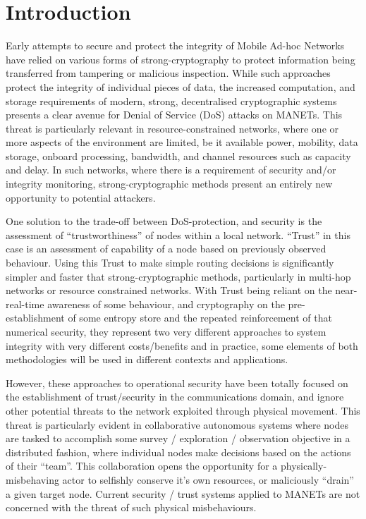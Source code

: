 \documentclass[conference,compsoc,letterpaper]{IEEEtran}
\begin{document}
%
\IEEEpeerreviewmaketitle



\section{Introduction}

Early attempts to secure and protect the integrity of Mobile Ad-hoc Networks have relied on various forms of strong-cryptography to protect information being transferred from tampering or malicious inspection.
While such approaches protect the integrity of individual pieces of data, the increased computation, and storage requirements of modern, strong, decentralised cryptographic systems presents a clear avenue for Denial of Service (DoS) attacks on MANETs.
This threat is particularly relevant in resource-constrained networks, where one or more aspects of the environment are limited, be it available power, mobility, data storage, onboard processing, bandwidth, and channel resources such as capacity and delay.
In such networks, where there is a requirement of security and/or integrity monitoring, strong-cryptographic methods present an entirely new opportunity to potential attackers.

One solution to the trade-off between DoS-protection, and security is the assessment of ``trustworthiness'' of nodes within a local network. 
``Trust'' in this case is an assessment of capability of a node based on previously observed behaviour.
Using this Trust to make simple routing decisions is significantly simpler and faster that strong-cryptographic methods, particularly in multi-hop networks or resource constrained networks\cite{Cordasco2008}.
With Trust being reliant on the near-real-time awareness of some behaviour, and cryptography on the pre-establishment of some entropy store and the repeated reinforcement of that numerical security, they represent two very different approaches to system integrity with very different costs/benefits and in practice, some elements of both methodologies will be used in different contexts and applications. 

However, these approaches to operational security have been totally focused on the establishment of trust/security in the communications domain, and ignore other potential threats to the network exploited through physical movement.
This threat is particularly evident in collaborative autonomous systems where nodes are tasked to accomplish some survey / exploration / observation objective in a distributed fashion, where individual nodes make decisions based on the actions of their ``team''. 
This collaboration opens the opportunity for a physically-misbehaving actor to selfishly conserve it's own resources, or maliciously ``drain'' a given target node.
Current security / trust systems applied to MANETs are not concerned with the threat of such physical misbehaviours.
\end{document}
